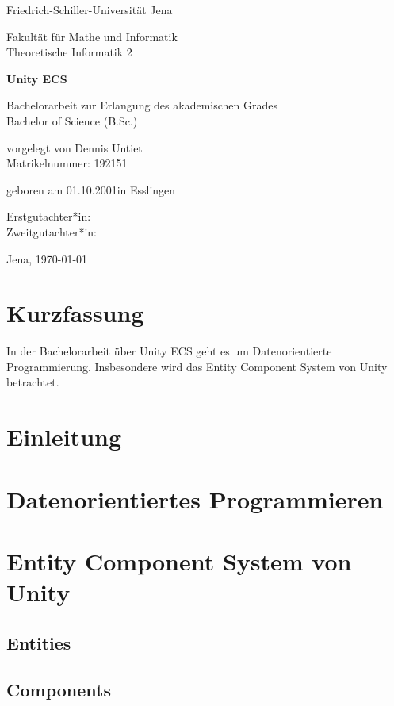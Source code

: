 \documentclass[12pt, titlepage]{article}
\newcommand{\myTitle}{Unity ECS}
\begin{document}
\begin{titlepage}
\centering
{\huge Friedrich-Schiller-Universität Jena \par}
{\large Fakultät für Mathe und Informatik\\Theoretische Informatik 2\par}
\vspace{1.5cm}
{\huge\bfseries \myTitle\par}
\vspace{2cm}
{\Large Bachelorarbeit zur Erlangung des akademischen Grades\\Bachelor of Science (B.Sc.) \par}
\vspace{3cm}
{\large vorgelegt von Dennis Untiet\\Matrikelnummer: 192151\par}
\vspace{0.5cm}
{\large geboren am 01.10.2001\quad in Esslingen\par}
\vspace{2cm}
{\large Erstgutachter*in:\\Zweitgutachter*in:\par} 
\vfill
{\Large Jena, \today}
\end{titlepage}
\section{Kurzfassung}
In der Bachelorarbeit über {\myTitle} geht es um Datenorientierte Programmierung. Insbesondere wird das Entity Component System von Unity betrachtet.
\newpage
\tableofcontents
\newpage
\section{Einleitung}
\newpage
\section{Datenorientiertes Programmieren}
\newpage
\section{Entity Component System von Unity}
\subsection{Entities}
\subsection{Components}
\end{document}
